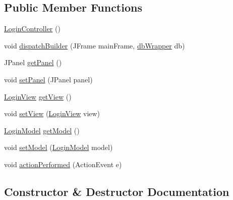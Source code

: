 \subsection*{Public Member Functions}
\begin{DoxyCompactItemize}
\item 
\mbox{\hyperlink{classcom_1_1_b_n_u_1_1pages_1_1login_1_1_login_controller_a354831478345b6d8efaf590e71ccf41a}{Login\+Controller}} ()
\item 
void \mbox{\hyperlink{classcom_1_1_b_n_u_1_1pages_1_1login_1_1_login_controller_a2991387fe971d48ef31f8a71c006f805}{dispatch\+Builder}} (J\+Frame main\+Frame, \mbox{\hyperlink{interfacecom_1_1_b_n_u_1_1database_1_1db_wrapper}{db\+Wrapper}} db)
\item 
J\+Panel \mbox{\hyperlink{classcom_1_1_b_n_u_1_1pages_1_1login_1_1_login_controller_a6325ab1ef81c84aaf12feafe306e1b3f}{get\+Panel}} ()
\item 
void \mbox{\hyperlink{classcom_1_1_b_n_u_1_1pages_1_1login_1_1_login_controller_af0965689563afdeb1b40929ebfea38bf}{set\+Panel}} (J\+Panel panel)
\item 
\mbox{\hyperlink{classcom_1_1_b_n_u_1_1pages_1_1login_1_1_login_view}{Login\+View}} \mbox{\hyperlink{classcom_1_1_b_n_u_1_1pages_1_1login_1_1_login_controller_aca43b5536b6fefb1b705d8a6619ae116}{get\+View}} ()
\item 
void \mbox{\hyperlink{classcom_1_1_b_n_u_1_1pages_1_1login_1_1_login_controller_ae8e8522e45ad45975f398fad771d5a33}{set\+View}} (\mbox{\hyperlink{classcom_1_1_b_n_u_1_1pages_1_1login_1_1_login_view}{Login\+View}} view)
\item 
\mbox{\hyperlink{classcom_1_1_b_n_u_1_1pages_1_1login_1_1_login_model}{Login\+Model}} \mbox{\hyperlink{classcom_1_1_b_n_u_1_1pages_1_1login_1_1_login_controller_adbd499196599c35bdda8cde05aa5a9d9}{get\+Model}} ()
\item 
void \mbox{\hyperlink{classcom_1_1_b_n_u_1_1pages_1_1login_1_1_login_controller_a5c6e261caf11598b6f939805ed5d97cc}{set\+Model}} (\mbox{\hyperlink{classcom_1_1_b_n_u_1_1pages_1_1login_1_1_login_model}{Login\+Model}} model)
\item 
void \mbox{\hyperlink{classcom_1_1_b_n_u_1_1pages_1_1login_1_1_login_controller_abad4e8b176e3cdfb0c2b650f17c71eef}{action\+Performed}} (Action\+Event e)
\end{DoxyCompactItemize}


\subsection{Constructor \& Destructor Documentation}
\mbox{\label{classcom_1_1_b_n_u_1_1pages_1_1login_1_1_login_controller_a354831478345b6d8efaf590e71ccf41a}} 
